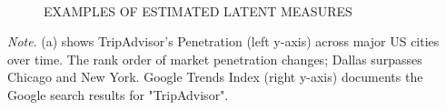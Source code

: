 \documentclass[mksc,blindrev]{informs3} %
\begin{document}
 
\begin{figure}[htp]
\caption{EXAMPLES OF ESTIMATED LATENT MEASURES}
 \centering
 \\
\end{figure}
 \begin{flushleft}
\small
\textit{Note}. (a) shows TripAdvisor's Penetration (left y-axis) across major US cities over time. The rank order of market penetration changes; Dallas surpasses Chicago and New York. Google Trends Index (right y-axis) documents the Google search results for "TripAdvisor".

\end{flushleft}
\clearpage
\end{document}

